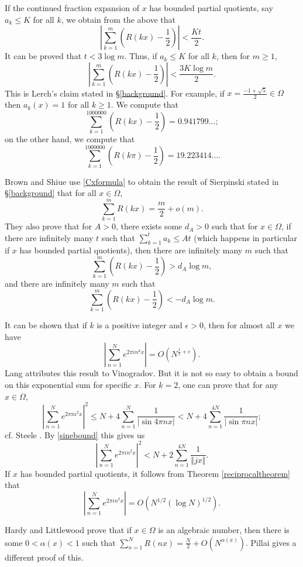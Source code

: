 \documentclass{article}
\newcommand{\norm}[1]{\left\Vert #1 \right\Vert}
\begin{document}
If the continued fraction expansion of $x$ has bounded partial quotients, say $a_k \leq K$ for all $k$, we obtain from the above that
\[
\left| \sum_{k=1}^m \left(R(kx)-\frac{1}{2}\right) \right| < \frac{Kt}{2}.
\]
It can be proved \cite[p.~185, Fact~2]{MR1316813} that $t<3\log m$. Thus, if $a_k \leq K$ for all $k$, then for $m \geq 1$,
\[
\left| \sum_{k=1}^m \left(R(kx)-\frac{1}{2}\right) \right| < \frac{3K\log m}{2}.
\]
This is Lerch's claim stated in \S \ref{background}.
For example, if  $x=\frac{-1+\sqrt{5}}{2} \in \Omega$ then $a_k(x)=1$ for all $k \geq 1$. We compute that 
\[
\sum_{k=1}^{1000000} \left(R(kx)-\frac{1}{2}\right)=0.941799\ldots;
\]
on the other hand, we compute that
\[
\sum_{k=1}^{1000000} \left( R(k\pi)-\frac{1}{2} \right)=19.223414\ldots.
\]

Brown and Shiue \cite[p.~185, Fact~1]{MR1316813}  use \eqref{Cxformula} to obtain the result of Sierpinski stated in \S \ref{background} that
for all $x \in \Omega$,
\[
\sum_{k=1}^m R(kx)=\frac{m}{2}+o(m).
\]
They also prove \cite[p.~188, Theorem~4]{MR1316813} that for $A>0$, there exists some $d_A>0$ such that for $x \in \Omega$, if there
are infinitely many  $t$ such that $\sum_{k=1}^t a_k \leq At$ (which happens in particular if $x$ has bounded partial quotients), then there are infinitely many $m$ such that
\[
\sum_{k=1}^m \left(R(kx)-\frac{1}{2}\right)>d_A \log m,
\]
and there are infinitely many $m$ such that
\[
\sum_{k=1}^m \left(R(kx)-\frac{1}{2}\right)< -d_A \log m.
\]

It can be shown \cite[p.~44, Theorem 4]{MR0209227} that if $k$ is a positive integer 
and $\epsilon>0$, then
for almost all $x$ we have 
\[
\left| \sum_{n=1}^N e^{2\pi i n^k x} \right| = O\left( N^{\frac{1}{2}+\epsilon}\right).
\]
Lang attributes this result to Vinogradov. But it is not so easy to obtain a bound on this exponential sum for specific $x$. For $k=2$, one can prove
\cite[p.~45, Lemma]{MR0209227}  that for any $x \in \Omega$,
\[
\left| \sum_{n=1}^N e^{2\pi i n^2 x} \right|^2 \leq N + 4\sum_{n=1}^N \frac{1}{|\sin 4\pi n x|}<
N+4\sum_{n=1}^{4N}  \frac{1}{|\sin \pi n x|};
\]
cf. Steele \cite[Problem 14.2]{steele}.
By \eqref{sinebound} this gives us
\[
\left| \sum_{n=1}^N e^{2\pi i n^2 x} \right|^2 < N+2\sum_{n=1}^{4N} \frac{1}{\norm{jx}}.
\]
If $x$ has bounded partial quotients, it follows from Theorem \ref{reciprocaltheorem} that
\[
\left| \sum_{n=1}^N e^{2\pi i n^2 x} \right| = O\left(N^{1/2}(\log N)^{1/2}\right).
\]

Hardy and Littlewood \cite[p.~28, Theorem B5]{latticeI} prove  that if $x \in \Omega$ is an algebraic number, then
there is some $0<\alpha(x)<1$ such that $\sum_{n=1}^N R(nx) = \frac{N}{2} + O(N^{\alpha(x)})$.
Pillai \cite{pillai1}  gives a different proof of this. 
\end{document}
